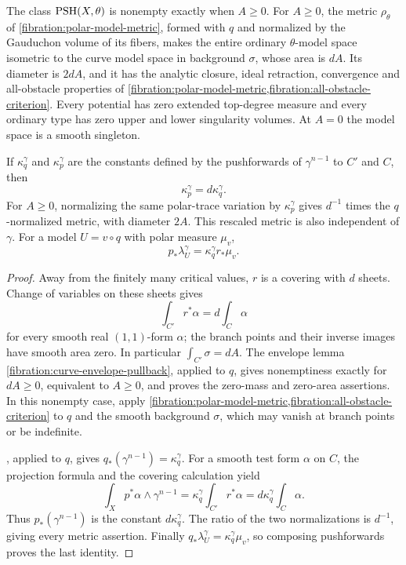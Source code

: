 \begin{proposition}\label{fibration:finite-curve-factor}
The class $\mathrm{PSH}(X,\theta)$ is nonempty exactly when $A\geq0$.
For $A\geq0$, the metric $\rho_\theta$ of
\cref{fibration:polar-model-metric}, formed with $q$ and normalized
by the Gauduchon volume of its fibers, makes the entire ordinary
$\theta$-model space isometric to the curve model space in
background $\sigma$, whose area is $dA$. Its diameter is $2dA$,
and it has the analytic closure, ideal retraction, convergence and
all-obstacle properties of
\cref{fibration:polar-model-metric,fibration:all-obstacle-criterion}. Every potential has zero extended top-degree
measure and every ordinary type has zero upper and lower
singularity volumes. At $A=0$ the model space is a smooth singleton.

If $\kappa_q^\gamma$ and $\kappa_p^\gamma$ are the constants
defined by the pushforwards of $\gamma^{n-1}$ to $C'$ and $C$,
then
\[
 \kappa_p^\gamma=d\kappa_q^\gamma.
\]
For $A\geq0$, normalizing the same polar-trace variation by
$\kappa_p^\gamma$ gives $d^{-1}$ times the $q$-normalized metric,
with diameter $2A$. This rescaled metric is also independent of
$\gamma$. For a model $U=v\circ q$ with polar measure $\mu_v$,
\[
 p_*\lambda_U^\gamma=\kappa_q^\gamma r_*\mu_v.
\]
\end{proposition}
\begin{proof}
Away from the finitely many critical values, $r$ is a covering
with $d$ sheets. Change of variables on these sheets gives
\[
 \int_{C'}r^*\alpha=d\int_C\alpha
\]
for every smooth real $(1,1)$-form $\alpha$; the branch points
and their inverse images have smooth area zero. In particular
$\int_{C'}\sigma=dA$. The envelope lemma
\cref{fibration:curve-envelope-pullback}, applied to $q$, gives
nonemptiness exactly for $dA\geq0$, equivalent to $A\geq0$,
and proves the zero-mass and zero-area assertions. In this
nonempty case, apply
\cref{fibration:polar-model-metric,fibration:all-obstacle-criterion}
to $q$ and the smooth background $\sigma$, which may vanish at
branch points or be indefinite.

, applied to $q$, gives
$q_*(\gamma^{n-1})=\kappa_q^\gamma$. For a smooth test form
$\alpha$ on $C$, the projection formula and the covering
calculation yield
\[
 \int_Xp^*\alpha\wedge\gamma^{n-1}
  =\kappa_q^\gamma\int_{C'}r^*\alpha
  =d\kappa_q^\gamma\int_C\alpha.
\]
Thus $p_*(\gamma^{n-1})$ is the constant $d\kappa_q^\gamma$.
The ratio of the two normalizations is $d^{-1}$, giving every
metric assertion. Finally
$q_*\lambda_U^\gamma=\kappa_q^\gamma\mu_v$, so composing
pushforwards proves the last identity.
\end{proof}

